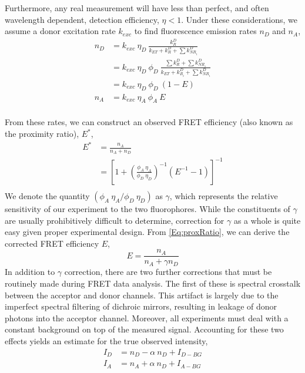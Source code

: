 \documentclass{article}
\newcommand{\NR}{\ensuremath{\mathit{NR}}}          %
\newcommand{\ET}{\ensuremath{\mathit{ET}}}          %
\begin{document}
Furthermore, any real measurement will have less than perfect, and
often wavelength dependent, detection efficiency, $\eta < 1$.  Under
these considerations, we assume a donor excitation rate $k_{exc}$ to
find fluorescence emission rates $n_D$ and $n_A$,
\begin{align*}
  n_D & = k_{exc} ~ \eta_D ~ \frac{k^D_R}{k_\ET + k^D_R + \sum k^D_{\NR_i}} \\
      & = k_{exc} ~ \eta_D ~ \phi_D ~
         \frac{\sum k^D_R + \sum k^D_{\NR_i}}{k_\ET + k^D_{R_i} + \sum k^D_{\NR_i}} \\
      & = k_{exc} ~ \eta_D ~ \phi_D ~ (1 - E) \\
  n_A & = k_{exc} ~ \eta_A ~ \phi_A ~ E \\
\end{align*}

From these rates, we can construct an observed FRET efficiency (also
known as the proximity ratio), $E^*$,
\begin{align*}
  E^* & = \frac{n_A}{n_A + n_D} \\
      & = \left[ 1 + \left(\frac{\phi_A~\eta_A}{\phi_D~\eta_D}\right)^{-1} (E^{-1} - 1) \right]^{-1} \\ \label{Eq:proxRatio}
\end{align*}
We denote the quantity $(\phi_A~\eta_A / \phi_D~\eta_D)$ as $\gamma$,
which represents the relative sensitivity of our experiment to the two
fluorophores. While the constituents of $\gamma$ are usually
prohibitively difficult to determine, correction for $\gamma$ as a
whole is quite easy given proper experimental design. From
\eqref{Eq:proxRatio}, we can derive the corrected FRET efficiency $E$,
\begin{equation}
  E = \frac{n_A}{n_A + \gamma n_D}
  \label{Eq:gammaFretEff}
\end{equation}
In addition to $\gamma$ correction, there are two further corrections that
must be routinely made during FRET data analysis. The first of these
is spectral crosstalk between the acceptor and donor channels. This
artifact is largely due to the imperfect spectral filtering of
dichroic mirrors, resulting in leakage of donor photons into the
acceptor channel. Moreover, all experiments must deal with a constant
background on top of the measured signal. Accounting for these two effects
yields an estimate for the true observed intensity,
\begin{align*}
  I_D & = n_D - \alpha~n_D + I_{D-BG} \\
  I_A & = n_A + \alpha~n_D + I_{A-BG} \\
\end{align*} 
\end{document}
